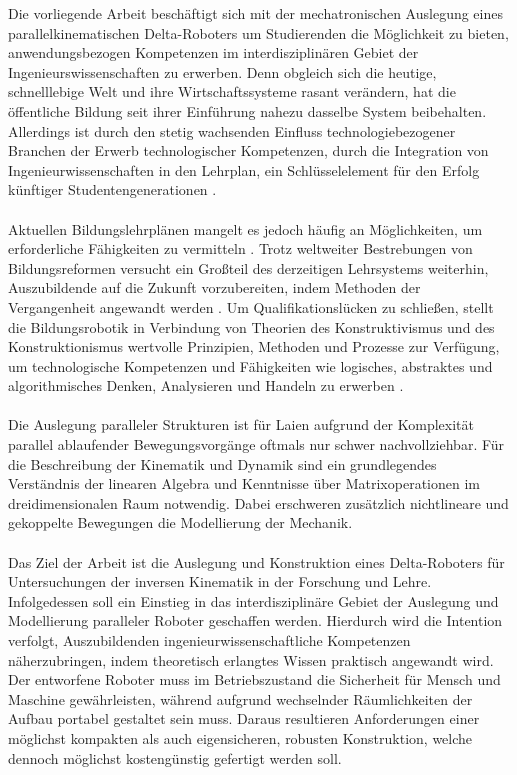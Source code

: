 \documentclass[Bachelor, BMR, ngerman]{twbook}
\begin{document}
    Die vorliegende Arbeit beschäftigt sich mit der mechatronischen Auslegung eines parallelkinematischen Delta-Roboters um Studierenden die Möglichkeit zu bieten, anwendungsbezogen Kompetenzen im interdisziplinären Gebiet der Ingenieurswissenschaften zu erwerben. Denn obgleich sich die heutige, schnelllebige Welt und ihre Wirtschaftssysteme rasant verändern, hat die öffentliche Bildung seit ihrer Einführung nahezu dasselbe System beibehalten. Allerdings ist durch den stetig wachsenden Einfluss technologiebezogener Branchen der Erwerb technologischer Kompetenzen, durch die Integration von Ingenieurwissenschaften in den Lehrplan, ein Schlüsselelement für den Erfolg künftiger Studentengenerationen \cite{Eg14}.\\
    \\
    Aktuellen Bildungslehrplänen mangelt es jedoch häufig an Möglichkeiten, um erforderliche Fähigkeiten zu vermitteln \cite{IFR18}. Trotz weltweiter Bestrebungen von Bildungsreformen versucht ein Großteil des derzeitigen Lehrsystems weiterhin, Auszubildende auf die Zukunft vorzubereiten, indem Methoden der Vergangenheit angewandt werden \cite{Eg14}. Um Qualifikationslücken zu schließen, stellt die Bildungsrobotik in Verbindung von Theorien des Konstruktivismus und des Konstruktionismus wertvolle Prinzipien, Methoden und Prozesse zur Verfügung, um technologische Kompetenzen und Fähigkeiten wie logisches, abstraktes und algorithmisches Denken, Analysieren und Handeln zu erwerben \cite{Eg16,ToLa16}.\\
    \\
    Die Auslegung paralleler Strukturen ist für Laien aufgrund der Komplexität parallel ablaufender Bewegungsvorgänge oftmals nur schwer nachvollziehbar. Für die Beschreibung der Kinematik und Dynamik sind ein grundlegendes Verständnis der linearen Algebra und  Kenntnisse über Matrixoperationen im dreidimensionalen Raum notwendig. Dabei erschweren zusätzlich nichtlineare und gekoppelte Bewegungen die Modellierung der Mechanik.\\
    \\
    Das Ziel der Arbeit ist die Auslegung und Konstruktion eines Delta-Roboters für Untersuchungen der inversen Kinematik in der Forschung und Lehre. Infolgedessen soll ein Einstieg in das interdisziplinäre Gebiet der Auslegung und Modellierung paralleler Roboter geschaffen werden. Hierdurch wird die Intention verfolgt, Auszubildenden ingenieurwissenschaftliche Kompetenzen näherzubringen, indem theoretisch erlangtes Wissen praktisch angewandt wird. Der entworfene Roboter muss im Betriebszustand die Sicherheit für Mensch und Maschine gewährleisten, während aufgrund wechselnder Räumlichkeiten der Aufbau portabel gestaltet sein muss. Daraus resultieren Anforderungen einer möglichst kompakten als auch eigensicheren, robusten Konstruktion, welche dennoch möglichst kostengünstig gefertigt werden soll.
\end{document}
